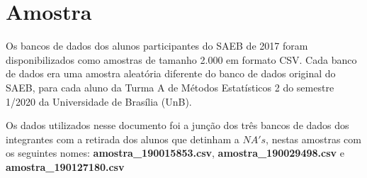 
\chapter{Amostra}
Os bancos de dados dos alunos participantes do SAEB de 2017 foram disponibilizados como
amostras de tamanho 2.000 em formato CSV. Cada banco de dados era uma amostra aleatória
diferente do banco de dados original do SAEB, para cada aluno da Turma A
de Métodos Estatísticos 2 do semestre 1/2020 da Universidade de Brasília (UnB).

Os dados utilizados nesse documento foi a junção dos três bancos de dados dos integrantes com
a retirada dos alunos que detinham a $NA's$, nestas amostras com os seguintes nomes: \textbf{amostra\_190015853.csv}, \textbf{amostra\_190029498.csv} e 
\textbf{amostra\_190127180.csv}